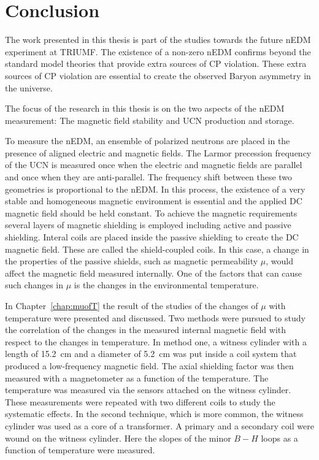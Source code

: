 \chapter{Conclusion\label{chap:overall}}


The work presented in this thesis is part of the studies towards the
future nEDM experiment at TRIUMF. The existence of a non-zero nEDM
confirms beyond the standard model theories that provide extra sources
of CP violation. These extra sources of CP violation are essential to
create the observed Baryon asymmetry in the universe.

The focus of the research in this thesis is on the two aspects of the
nEDM measurement: The magnetic field stability and UCN production and
storage.

To measure the nEDM, an ensemble of polarized neutrons are placed in
the presence of aligned electric and magnetic fields. The Larmor
precession frequency of the UCN is measured once when the electric and
magnetic fields are parallel and once when they are anti-parallel. The
frequency shift between these two geometries is proportional to the
nEDM. In this process, the existence of a very stable and homogeneous
magnetic environment is essential and the applied DC magnetic field
should be held constant. To achieve the magnetic requirements several
layers of magnetic shielding is employed including active and passive
shielding. Interal coils are placed inside the passive shielding to
create the DC magnetic field. These are called the shield-coupled
coils. In this case, a change in the properties of the passive
shields, such as magnetic permeability $\mu$, would affect the
magnetic field measured internally. One of the factors that can cause
such changes in $\mu$ is the changes in the environmental temperature.

In Chapter~\ref{chap:muofT} the result of the studies of the changes
of $\mu$ with temperature were presented and discussed. Two methods
were pursued to study the correlation of the changes in the measured
internal magnetic field with respect to the changes in temperature. In
method one, a witness cylinder with a length of 15.2~cm and a diameter
of 5.2~cm was put inside a coil system that produced a low-frequency
magnetic field. The axial shielding factor was then measured with a
magnetometer as a function of the temperature. The temperature was
measured via the sensors attached on the witness cylinder. These
measurements were repeated with two different coils to study the
systematic effects. In the second technique, which is more common, the
witness cylinder was used as a core of a transformer. A primary and a
secondary coil were wound on the witness cylinder. Here the slopes of
the minor $B-H$ loops as a function of temperature were measured.

